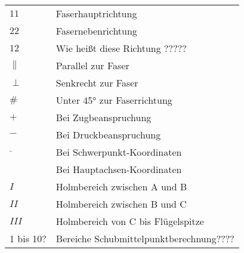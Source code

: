 \begin{table}[h]
	\begin{tabular}{ll}
		$ 11 $&Faserhauptrichtung\\
		$ 22 $&Fasernebenrichtung\\
		$ 12 $&Wie heißt diese Richtung ?????\\
		$ \parallel $&Parallel zur Faser\\
		$ \perp $&Senkrecht zur Faser\\
		$ \# $&Unter 45° zur Faserrichtung\\
		$ + $&Bei Zugbeanspruchung\\
		$ - $&Bei Druckbeanspruchung\\
		$ \bar{ } $&Bei Schwerpunkt-Koordinaten\\
		$ \hat{ } $&Bei Hauptachsen-Koordinaten\\
		$ I $ &Holmbereich zwischen A und B\\
		$ II $ &Holmbereich zwischen B und C\\
		$ III $ &Holmbereich von C bis Flügelspitze\\
		1 bis 10? & Bereiche Schubmittelpunktberechnung????
	\end{tabular}
\end{table}

